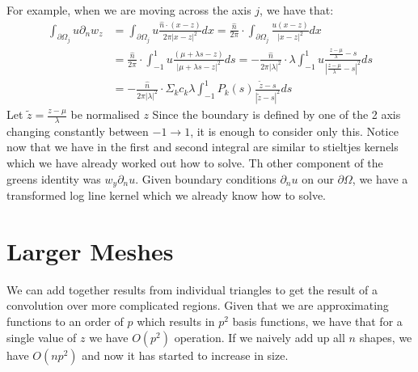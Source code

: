 \documentclass{article}
\begin{document}
For example, when we are moving across the axis $j$, we have that:
\begin{align}
    \int_{\partial\Omega_j}u\partial_nw_z&=\int_{\partial\Omega_j}u\frac{\hat n\cdot(x-z)}{2\pi|x-z|^2}dx
    =\frac{\hat n}{2\pi}\cdot\int_{\partial\Omega_j}\frac{u(x-z)}{|x-z|^2}dx\\
    &=\frac{\hat n}{2\pi}\cdot\int_{-1}^1u\frac{(\mu+\lambda s-z)}{|\mu+\lambda s-z|^2}ds
    =-\frac{\hat n}{2\pi|\lambda|^2}\cdot\lambda\int_{-1}^1u\frac{\frac{z-\mu}{\lambda}- s}{|\frac{z-\mu}{\lambda}-s|^2}ds\\
    &=-\frac{\hat n}{2\pi|\lambda|^2}\cdot\Sigma_kc_k\lambda\int_{-1}^1P_k(s)\frac{\tilde z- s}{|\tilde z-s|^2}ds
\end{align}
Let $\tilde z = \frac{z-\mu}{\lambda}$ be normalised $z$
Since the boundary is defined by one of the 2 axis changing constantly between $-1\rightarrow 1$, it is enough to consider only this.
Notice now that we have in the first and second integral are similar to stieltjes kernels which we have already worked out how to solve.
Th other component of the greens identity was $w_y\partial_nu$.
Given boundary conditions $\partial_nu$ on our $\partial\Omega$, we have a transformed log line kernel which we already know how to solve.
\section{Larger Meshes}
We can add together results from individual triangles to get the result of a convolution over more complicated regions.
Given that we are approximating functions to an order of $p$ which results in $p^2$ basis functions, we have that for a single value of $z$ we have $O(p^2)$ operation.
If we naively add up all $n$ shapes, we have $O(np^2)$ and now it has started to increase in size.
\end{document}
